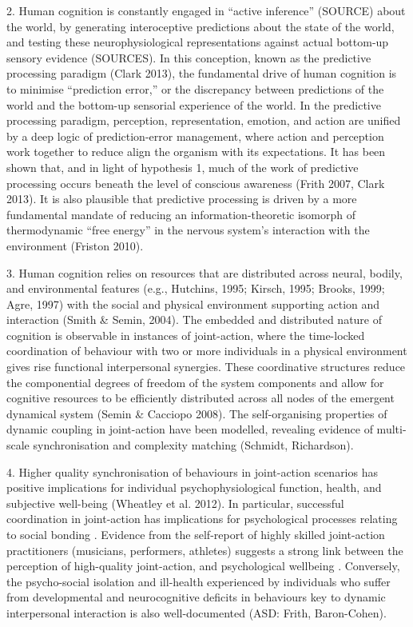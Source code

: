 \documentclass[12pt]{report}
\begin{document}
2. Human cognition is constantly engaged in ``active inference'' (SOURCE) about the world, by generating interoceptive predictions about the state of the world, and testing these neurophysiological representations against actual bottom-up sensory evidence (SOURCES).  In this conception, known as the predictive processing paradigm (Clark 2013), the fundamental drive of human cognition is to minimise ``prediction error,'' or the discrepancy between predictions of the world and the bottom-up sensorial experience of the world. In the predictive processing paradigm, perception, representation, emotion, and action are unified by a deep logic of prediction-error management, where action and perception work together to reduce align the organism with its expectations.  It has been shown that, and in light of hypothesis 1, much of the work of predictive processing occurs beneath the level of conscious awareness (Frith 2007, Clark 2013). It is also plausible that predictive processing is driven by a more fundamental mandate of reducing an information-theoretic isomorph of thermodynamic ``free energy'' in the nervous system's interaction with the environment (Friston 2010).

3. Human cognition relies on resources that are distributed across neural, bodily, and environmental features (e.g., Hutchins, 1995; Kirsch, 1995; Brooks, 1999; Agre, 1997) with the social and physical environment supporting action and interaction (Smith & Semin, 2004).  The embedded and distributed nature of cognition is observable in instances of joint-action, where the time-locked coordination of behaviour with two or more individuals in a physical environment gives rise functional interpersonal synergies.  These coordinative structures reduce the componential degrees of freedom of the system components and allow for cognitive resources to be efficiently distributed across all nodes of the emergent dynamical system (Semin & Cacciopo 2008).  The self-organising properties of dynamic coupling in joint-action have been modelled, revealing evidence of multi-scale synchronisation and complexity matching (Schmidt, Richardson).

4. Higher quality synchronisation of behaviours in joint-action scenarios has positive implications for individual psychophysiological function, health, and subjective well-being (Wheatley et al. 2012).  In particular, successful coordination in joint-action has implications for psychological processes relating to social bonding \citep{marsh2009a,Launay2016}.  Evidence from the self-report of highly skilled joint-action practitioners (musicians, performers, athletes) suggests a strong link between the perception of high-quality joint-action, and psychological wellbeing \citep{Jackson1995,Jackson1992}.  Conversely, the psycho-social isolation and ill-health experienced by individuals who suffer from developmental and neurocognitive deficits in behaviours key to dynamic interpersonal interaction is also well-documented (ASD: Frith, Baron-Cohen).
\end{document}
